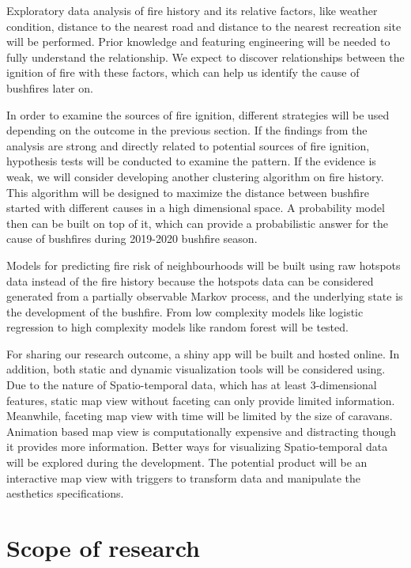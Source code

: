 \documentclass{monashthesis}
\begin{document}
Exploratory data analysis of fire history and its relative factors, like
weather condition, distance to the nearest road and distance to the
nearest recreation site will be performed. Prior knowledge and featuring
engineering will be needed to fully understand the relationship. We
expect to discover relationships between the ignition of fire with these
factors, which can help us identify the cause of bushfires later on.

In order to examine the sources of fire ignition, different strategies
will be used depending on the outcome in the previous section. If the
findings from the analysis are strong and directly related to potential
sources of fire ignition, hypothesis tests will be conducted to examine
the pattern. If the evidence is weak, we will consider developing
another clustering algorithm on fire history. This algorithm will be
designed to maximize the distance between bushfire started with
different causes in a high dimensional space. A probability model then
can be built on top of it, which can provide a probabilistic answer for
the cause of bushfires during 2019-2020 bushfire season.

Models for predicting fire risk of neighbourhoods will be built using
raw hotspots data instead of the fire history because the hotspots data
can be considered generated from a partially observable Markov process,
and the underlying state is the development of the bushfire. From low
complexity models like logistic regression to high complexity models
like random forest will be tested.

For sharing our research outcome, a shiny app will be built and hosted
online. In addition, both static and dynamic visualization tools will be
considered using. Due to the nature of Spatio-temporal data, which has
at least 3-dimensional features, static map view without faceting can
only provide limited information. Meanwhile, faceting map view with time
will be limited by the size of caravans. Animation based map view is
computationally expensive and distracting though it provides more
information. Better ways for visualizing Spatio-temporal data will be
explored during the development. The potential product will be an
interactive map view with triggers to transform data and manipulate the
aesthetics specifications.

\section{Scope of research}\label{scope-of-research}
\end{document}
